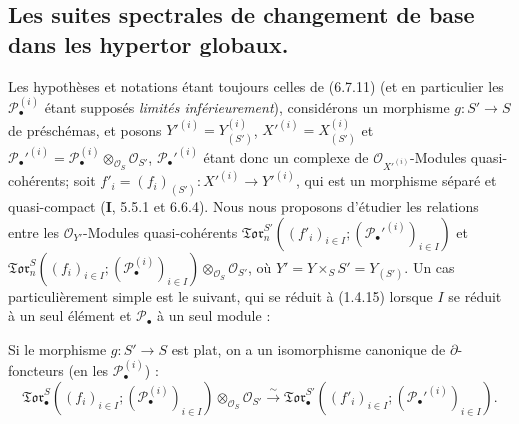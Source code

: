 \subsection{Les suites spectrales de changement de base dans les hypertor
globaux.}

\begin{env}[6.9.1]
Les hypothèses et notations étant toujours celles de (6.7.11) (et en
particulier les $\mathscr P_\bullet^{(i)}$ étant supposés \emph{limités
inférieurement}), considérons un morphisme $g:S'\to S$ de préschémas, et
posons
$Y'^{(i)}=Y_{(S')}^{(i)}$, $X'^{(i)}=X_{(S')}^{(i)}$ et
$\mathscr P_\bullet'^{(i)}=
\mathscr P_\bullet^{(i)}\otimes_{\mathscr O_S}\mathscr O_{S'}$,
$\mathscr P_\bullet'^{(i)}$ étant donc un complexe de
$\mathscr O_{X'^{(i)}}$-Modules quasi-cohérents; soit
$f'_i=(f_i)_{(S')}:X'^{(i)}\to Y'^{(i)}$, qui est un morphisme séparé et
quasi-compact (\textbf{I}, 5.5.1 et 6.6.4). Nous nous proposons d'étudier les relations
entre les $\mathscr O_{Y'}$-Modules quasi-cohérents
$\mathfrak{Tor}_n^{S'}((f'_i)_{i\in I};
(\mathscr P_\bullet'^{(i)})_{i\in I})$ et
$\mathfrak{Tor}_n^S((f_i)_{i\in I};
(\mathscr P_\bullet^{(i)})_{i\in I})
\otimes_{\mathscr O_S}\mathscr O_{S'}$, où
$Y'=Y\times_S S'=Y_{(S')}$. Un cas particulièrement simple est le suivant,
qui se réduit à (1.4.15) lorsque $I$ se réduit à un seul élément et
$\mathscr P_\bullet$ à un seul module :
\end{env}

\begin{proposition}[6.9.2]
Si le morphisme $g:S'\to S$ est plat, on a un isomorphisme canonique de
$\partial$-foncteurs (en les $\mathscr P_\bullet^{(i)}$) :
\[
  \mathfrak{Tor}_\bullet^S
  ((f_i)_{i\in I};(\mathscr P_\bullet^{(i)})_{i\in I})
  \otimes_{\mathscr O_S}\mathscr O_{S'}
  \xrightarrow{\sim}
  \mathfrak{Tor}_\bullet^{S'}
  ((f'_i)_{i\in I};(\mathscr P_\bullet'^{(i)})_{i\in I}).
  \tag{6.9.2.1}\label{III.6.9.2.1.fr}
\]
\end{proposition}

